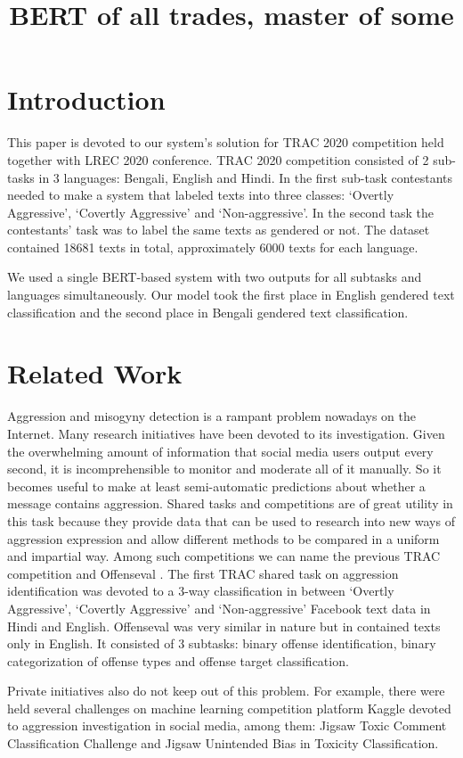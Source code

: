 \documentclass[10pt, a4paper]{article}
\title{{BERT of all trades, master of some}}
\begin{document}
\maketitleabstract


\section{Introduction}
\label{intro}
This paper is devoted to our system's solution for TRAC 2020 competition held together with LREC 2020 conference. TRAC 2020 competition consisted of 2 sub-tasks in 3 languages: Bengali, English and Hindi. In the first sub-task contestants needed to make a system that labeled texts into three classes: ‘Overtly Aggressive’, ‘Covertly Aggressive’ and ‘Non-aggressive’. In the second task the contestants' task was to label the same texts as gendered or not. The dataset contained 18681 texts in total, approximately 6000 texts for each language.

We used a single BERT-based system with two outputs for all subtasks and languages simultaneously. Our model took the first place in English gendered text classification and the second place in Bengali gendered text classification.

\section{Related Work}
Aggression and misogyny detection is a rampant problem nowadays on the Internet. Many research initiatives have been devoted to its investigation. Given the overwhelming amount of information that social media users output every second, it is incomprehensible to monitor and moderate all of it manually. So it becomes useful to make at least semi-automatic predictions about whether a message contains aggression. Shared tasks and competitions are of great utility in this task because they provide data that can be used to research into new ways of aggression expression and allow different methods to be compared in a uniform and impartial way. Among such competitions we can name the previous TRAC competition \cite{trac2018report} and Offenseval \cite{offenseval}. The first TRAC shared task on aggression identification was devoted to a 3-way classification in between ‘Overtly Aggressive’, ‘Covertly Aggressive’ and ‘Non-aggressive’ Facebook text data in Hindi and English. Offenseval was very similar in nature but in contained texts only in English. It consisted of 3 subtasks: binary offense identification, binary categorization of offense types and offense target classification.

Private initiatives also do not keep out of this problem. For example, there were held several challenges on machine learning competition platform Kaggle devoted to aggression investigation in social media, among them: Jigsaw Toxic Comment Classification Challenge and Jigsaw Unintended Bias in Toxicity Classification.
\end{document}
